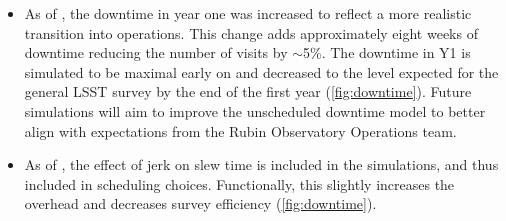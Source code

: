 
\begin{itemize}
\item As of , the downtime in year one was increased to reflect a more realistic transition into operations. This change adds approximately eight weeks of downtime reducing the number of visits by $\sim$5\%. The downtime in Y1 is simulated to be maximal early on and decreased to the level expected for the general LSST survey by the end of the first year (\autoref{fig:downtime}). Future simulations will aim to improve the unscheduled downtime model to better align with expectations from the Rubin Observatory Operations team. 

\item As of , the effect of jerk on slew time is included in the simulations, and thus included in scheduling choices. Functionally, this slightly increases the overhead and decreases survey efficiency (\autoref{fig:downtime}).


\end{itemize}
